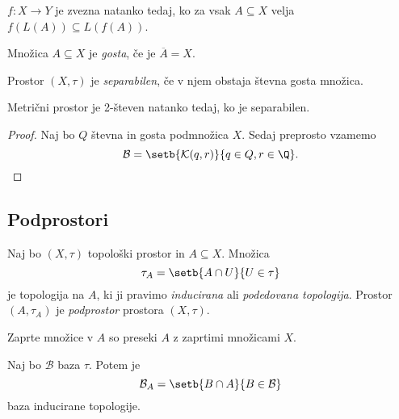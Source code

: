 \begin{trditev}
$f \colon X \to Y$ je zvezna natanko tedaj, ko za vsak
$A \subseteq X$ velja $f(L(A)) \subseteq L(f(A))$.
\end{trditev}


\begin{definicija}
Množica $A \subseteq X$ je \emph{gosta}, če je
$\overline{A} = X$.
\end{definicija}

\begin{definicija}
Prostor $(X, \tau)$ je
\emph{separabilen}, če v njem
obstaja števna gosta množica.
\end{definicija}

\begin{izrek}
Metrični prostor je 2-števen natanko tedaj, ko je separabilen.
\end{izrek}

\begin{proof}
Naj bo $Q$ števna in gosta podmnožica $X$. Sedaj preprosto vzamemo
\[
\mathcal{B} = \setb{\mathcal{K}(q,r)}{q \in Q, r \in \Q}. \qedhere
\]
\end{proof}

\newpage

\subsection{Podprostori}

\begin{definicija}
Naj bo $(X, \tau)$ topološki prostor in $A \subseteq X$. Množica
\[
\tau_A = \setb{A \cap U}{U \in \tau}
\]
je topologija na $A$, ki ji pravimo \emph{inducirana} ali
\emph{podedovana topologija}. Prostor
$(A, \tau_A)$ je
\emph{podprostor} prostora
$(X, \tau)$.
\end{definicija}

\begin{trditev}
Zaprte množice v $A$ so preseki $A$ z zaprtimi množicami $X$.
\end{trditev}

\obvs

\begin{trditev}
Naj bo $\mathcal{B}$ baza $\tau$. Potem je
\[
\mathcal{B}_A = \setb{B \cap A}{B \in \mathcal{B}}
\]
baza inducirane topologije.
\end{trditev}

